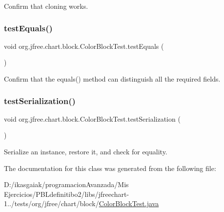 Confirm that cloning works. \mbox{\label{classorg_1_1jfree_1_1chart_1_1block_1_1_color_block_test_a3ffdd6a74df7d3a232628408deaa40c0}} 
\subsubsection{\texorpdfstring{test\+Equals()}{testEquals()}}
{\footnotesize\ttfamily void org.\+jfree.\+chart.\+block.\+Color\+Block\+Test.\+test\+Equals (\begin{DoxyParamCaption}{ }\end{DoxyParamCaption})}

Confirm that the equals() method can distinguish all the required fields. \mbox{\label{classorg_1_1jfree_1_1chart_1_1block_1_1_color_block_test_a745bea231409bc618d218db91869db97}} 
\subsubsection{\texorpdfstring{test\+Serialization()}{testSerialization()}}
{\footnotesize\ttfamily void org.\+jfree.\+chart.\+block.\+Color\+Block\+Test.\+test\+Serialization (\begin{DoxyParamCaption}{ }\end{DoxyParamCaption})}

Serialize an instance, restore it, and check for equality. 

The documentation for this class was generated from the following file\+:\begin{DoxyCompactItemize}
\item 
D\+:/ikasgaiak/programacion\+Avanzada/\+Mis Ejercicios/\+P\+B\+Ldefinitibo2/libs/jfreechart-\/1../tests/org/jfree/chart/block/\mbox{\hyperlink{_color_block_test_8java}{Color\+Block\+Test.\+java}}\end{DoxyCompactItemize}
